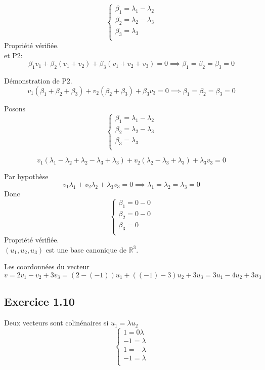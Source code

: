 \documentclass[]{book}
\theoremstyle{definition}
\newcommand{\bb}[1]{\mathbb{#1}}
\newcommand{\R}{\bb{R}}
\begin{document}
$$
\left\{ 
\begin{array}{l}
   \beta_1 = \lambda_1 - \lambda_2 \\
   \beta_2 = \lambda_2 - \lambda_3 \\
   \beta_3 = \lambda_3 \\
\end{array}
\right. 
$$
Propri\'et\'e v\'erifi\'ee.\\


et P2:
$$
\beta_1 v_{1} +\beta_2 (v_{1} + v_{2}) + \beta_3 (v_{1} + v_{2} + v_{3}) = 0
\implies
\beta_1=\beta_2=\beta_3=0
$$

D\'emonstration de P2.
$$
v_{1} (\beta_1 + \beta_2 + \beta_3) + v_{2} (\beta_2 + \beta_3) + \beta_3 v_{3} = 0
\implies
\beta_1=\beta_2=\beta_3=0
$$

Posons
$$
\left\{ 
\begin{array}{l}
   \beta_1 = \lambda_1 - \lambda_2 \\
   \beta_2 = \lambda_2 - \lambda_3 \\
   \beta_3 = \lambda_3 \\
\end{array}
\right.
$$

$$ 
v_{1} (\lambda_1 - \lambda_2 + \lambda_2 - \lambda_3 + \lambda_3) + v_{2} (\lambda_2 - \lambda_3 + \lambda_3) + \lambda_3 v_{3} = 0
$$

Par hypoth\`ese
$$ 
v_{1} \lambda_1 + v_{2} \lambda_2 + \lambda_3 v_{3} = 0 \implies \lambda_1=\lambda_2=\lambda_3=0
$$
Donc
$$
\left\{ 
\begin{array}{l}
   \beta_1 = 0 - 0 \\
   \beta_2 = 0 - 0 \\
   \beta_3 = 0 \\
\end{array}
\right.
$$
Propri\'et\'e v\'erifi\'ee.\\

$(u_1, u_2, u_3)$ est une base canonique de $\R^3$.

Les coordonn\'ees du vecteur $v=2v_1-v_2+3v_3 = (2-(-1))u_1 + ((-1)-3)u_2 + 3u_3 = 3u_1 -4 u_2 + 3u_3$ 

\subsection*{Exercice 1.10}
Deux vecteurs sont colin\'enaires si $u_1 = \lambda u_2$
$$
\left\{ 
\begin{array}{l}
   1 = 0 \lambda\\
   -1 = \lambda \\
   1 = -\lambda \\
   -1 = \lambda \\
\end{array}
\right.
$$
\end{document}
